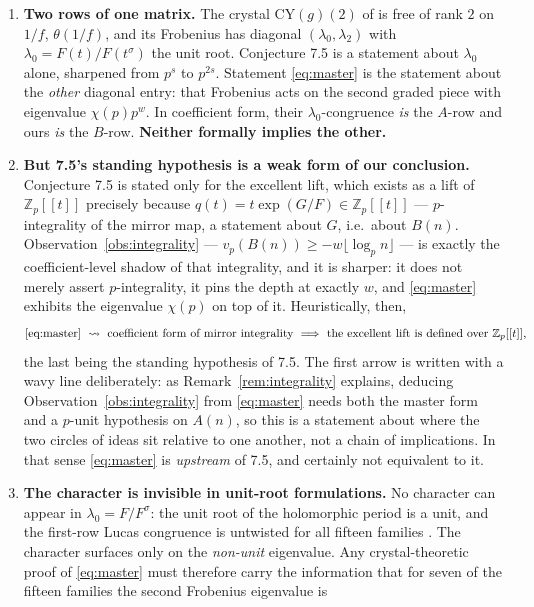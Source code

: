 \documentclass[11pt,reqno]{amsart}
\theoremstyle{plain}
\theoremstyle{definition}
\theoremstyle{remark}
\newcommand{\Z}{\mathbb{Z}}
\newcommand{\vp}{v_p}
\numberwithin{equation}{section}
\begin{document}
\begin{enumerate}[leftmargin=2em]
\item \textbf{Two rows of one matrix.} The crystal $\mathrm{CY}(g)(2)$ of \cite{BVthree} is
  free of rank $2$ on $1/f$, $\theta(1/f)$, and its Frobenius has diagonal
  $(\lambda_0,\lambda_2)$ with $\lambda_0=F(t)/F(t^\sigma)$ the unit root. Conjecture 7.5 is
  a statement about $\lambda_0$ alone, sharpened from $p^s$ to $p^{2s}$. Statement
  \eqref{eq:master} is the statement about the \emph{other} diagonal entry: that Frobenius
  acts on the second graded piece with eigenvalue $\chi(p)p^{w}$. In coefficient form,
  their $\lambda_0$-congruence \emph{is} the $A$-row and ours \emph{is} the $B$-row.
  \textbf{Neither formally implies the other.}
\item \textbf{But 7.5's standing hypothesis is a weak form of our conclusion.}
  Conjecture 7.5 is stated only for the excellent lift, which exists as a lift of
  $\Z_p[[t]]$ precisely because $q(t)=t\exp(G/F)\in\Z_p[[t]]$ --- $p$-integrality of the
  mirror map, a statement about $G$, i.e.\ about $B(n)$. Observation~\ref{obs:integrality}
  --- $\vp(B(n))\ge-w\lfloor\log_pn\rfloor$ --- is exactly the coefficient-level shadow of
  that integrality, and it is sharper: it does not merely assert $p$-integrality, it pins
  the depth at exactly $w$, and \eqref{eq:master} exhibits the eigenvalue $\chi(p)$ on top
  of it. Heuristically, then,
  \[
    \eqref{eq:master}\ \rightsquigarrow\ \text{coefficient form of mirror integrality}\
    \Longrightarrow\ \text{the excellent lift is defined over $\Z_p[[t]]$,}
  \]
  the last being the standing hypothesis of 7.5. The first arrow is written with a wavy
  line deliberately: as Remark~\ref{rem:integrality} explains, deducing
  Observation~\ref{obs:integrality} from \eqref{eq:master} needs both the master form and a
  $p$-unit hypothesis on $A(n)$, so this is a statement about where the two circles of
  ideas sit relative to one another, not a chain of implications. In that sense
  \eqref{eq:master} is \emph{upstream} of 7.5, and certainly not equivalent to it.
\item \textbf{The character is invisible in unit-root formulations.} No character can appear
  in $\lambda_0=F/F^{\sigma}$: the unit root of the holomorphic period is a unit, and the
  first-row Lucas congruence is untwisted for all fifteen families
  \cite{MalikStraub,Straub2301}. The character surfaces only on the \emph{non-unit}
  eigenvalue. Any crystal-theoretic proof of \eqref{eq:master} must therefore carry the
  information that for seven of the fifteen families the second Frobenius eigenvalue is

\end{enumerate}
\end{document}
